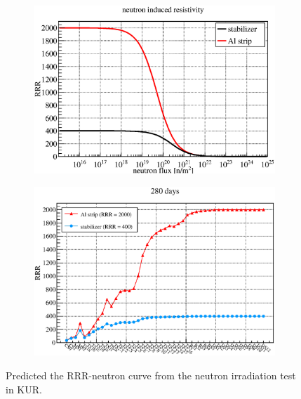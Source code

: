  \begin{figure}[H]
   \begin{subfigure}{0.3\textwidth}
    \centering
	\includegraphics[scale=0.45]{chapter5/fig/degradation.eps}
   \end{subfigure}
   \hspace{0.2\textwidth}
   \begin{subfigure}{0.3\textwidth}
    \centering
	\includegraphics[scale=0.45]{chapter5/fig/rrrmagnets.eps}
   \end{subfigure}
   \caption{Predicted the RRR-neutron curve from the neutron irradiation test in KUR.}
   \label{4rrr}
  \end{figure}

